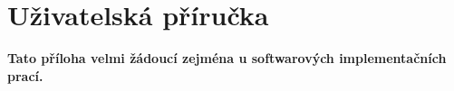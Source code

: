 \chapter{Uživatelská příručka}
\textbf{\large Tato příloha velmi žádoucí zejména u softwarových implementačních prací.}
